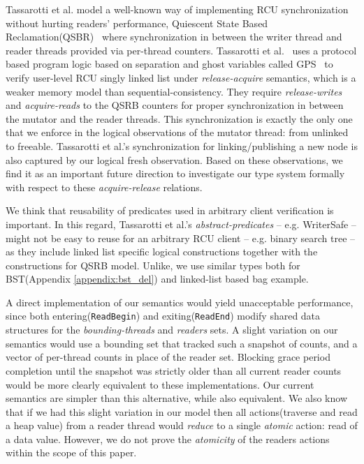 Tassarotti et al. model a well-known way of implementing RCU synchronization without hurting readers' performance, \textsf{Quiescent State Based Reclamation}(QSBR)~\cite{urcu_ieee} where synchronization in between the writer thread and reader threads provided via per-thread counters. Tassarotti et al.~\cite{verrcu} uses a protocol based program logic based on separation and ghost variables called \textsf{GPS}~\cite{Turon:2014:GNW:2660193.2660243} to verify user-level \textsf{RCU} singly linked list under \emph{release-acquire} semantics, which is a weaker memory model than sequential-consistency. They require \textit{release-writes} and \textit{acquire-reads} to the QSRB counters for proper synchronization in between the mutator and the reader threads. This synchronization is exactly the only one that we enforce in the logical observations of the mutator thread: from \textsf{unlinked} to \textsf{freeable}. Tassarotti et al.'s synchronization for linking/publishing a new node is also captured by our logical \textsf{fresh} observation. Based on these observations, we find it as an important future direction to investigate our type system formally with respect to these \textit{acquire-release} relations.

 We think that reusability of predicates used in arbitrary client verification is important. In this regard, Tassarotti et al.'s \textit{abstract-predicates} -- e.g. WriterSafe -- might not be easy to reuse for an arbitrary RCU client -- e.g. binary search tree -- as they include linked list specific logical constructions together with the constructions for QSRB model. Unlike, we use similar types both for BST(Appendix \ref{appendix:bst_del}) and linked-list based bag example.

 A direct implementation of our semantics would yield unacceptable performance, since both entering(\lstinline|ReadBegin|) and exiting(\lstinline|ReadEnd|) modify shared data structures for the \textit{bounding-threads} and \textit{readers} sets. A slight variation on our semantics would use a bounding set  that tracked such a snapshot of counts, and a vector of per-thread counts in place of the reader set. Blocking grace period completion until the snapshot was strictly older than all current reader counts would be more clearly equivalent to these implementations. Our current semantics are simpler than this alternative, while also equivalent. We also know that if we had this slight variation in our model then all actions(traverse and read a heap value) from a reader thread would \textit{reduce} to a single \textit{atomic} action: read of a data value. However, we do not prove the \textit{atomicity} of the readers actions within the scope of this paper.

